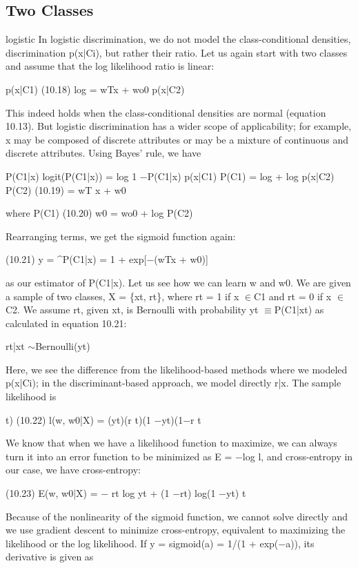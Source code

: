 \subsection{Two Classes}

logistic In logistic discrimination, we do not model the class-conditional densities, discrimination p(x|Ci), but rather their ratio. Let us again start with two classes and assume that the log likelihood ratio is linear:

p(x|C1) (10.18) log = wTx + wo0 p(x|C2)

This indeed holds when the class-conditional densities are normal (equation 10.13). But logistic discrimination has a wider scope of applicability; for example, x may be composed of discrete attributes or may be a mixture of continuous and discrete attributes. Using Bayes’ rule, we have

P(C1|x) logit(P(C1|x)) = log 1 $-$P(C1|x) p(x|C1) P(C1) = log + log p(x|C2) P(C2) (10.19) = wT x + w0

where P(C1) (10.20) w0 = wo0 + log P(C2)

Rearranging terms, we get the sigmoid function again:

(10.21) y = \textasciicircum{}P(C1|x) = 1 + exp[$-$(wTx + w0)]

as our estimator of P(C1|x). Let us see how we can learn w and w0. We are given a sample of two classes, X = \{xt, rt\}, where rt = 1 if x $\in$C1 and rt = 0 if x $\in$C2. We assume rt, given xt, is Bernoulli with probability yt $\equiv$P(C1|xt) as calculated in equation 10.21:

rt|xt $\sim$Bernoulli(yt)

Here, we see the difference from the likelihood-based methods where we modeled p(x|Ci); in the discriminant-based approach, we model directly r|x. The sample likelihood is

t) (10.22) l(w, w0|X) = (yt)(r t)(1 $-$yt)(1$-$r t

We know that when we have a likelihood function to maximize, we can always turn it into an error function to be minimized as E = $-$log l, and cross-entropy in our case, we have cross-entropy:

(10.23) E(w, w0|X) = $-$ rt log yt + (1 $-$rt) log(1 $-$yt) t

Because of the nonlinearity of the sigmoid function, we cannot solve directly and we use gradient descent to minimize cross-entropy, equivalent to maximizing the likelihood or the log likelihood. If y = sigmoid(a) = 1/(1 + exp($-$a)), its derivative is given as

